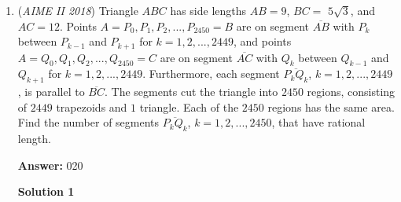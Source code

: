 \begin{enumerate}
 $\dfrac{36}{38} = \dfrac{18}{19}$
$18 + 19 = \boxed{037}$




\textbf{Solution 2}

This solution is essentially the same as solution 1, but it offers a different approach to factoring the polynomial. 

 We want to isolate $a$, so we rewrite $x^4 + 2ax^3 + (2a - 2)x^2 + (-4a + 3)x - 2$ as $x^4-2x^2+3x-2+2ax^3+2ax^2-4ax$.

 We see that $1$ and $-2$ are roots of $x^4-2x^2+3x-2$, so we can factor, yielding $(x-1)(x+2)(x^2-x+1)$.

 We can factor out $2ax$ from the other part of the polynomial, yielding $2ax(x^2+x-2)=2ax(x-1)(x+2)$.

 Thus, 

 \begin{align}x^4 + 2ax^3 + (2a - 2)x^2 + (-4a + 3)x - 2 &= x^4-2x^2+3x-2+2ax^3+2ax^2-4ax \\ &= (x-1)(x+2)(x^2-x+1) + 2ax(x-1)(x+2)\\&= (x-1)(x+2)(x^2+(2a-1)x+1). \\\end{align}

 The rest of the steps are the same as in Solution 1.

 \textbf{See Also:} 


	\item (\textit{AIME II 2018}) Triangle $ABC$ has side lengths $AB = 9$, $BC =$ $5\sqrt{3}$, and $AC = 12$. Points $A = P_{0}, P_{1}, P_{2}, ... , P_{2450} = B$ are on segment $\overline{AB}$ with $P_{k}$ between $P_{k-1}$ and $P_{k+1}$ for $k = 1, 2, ..., 2449$, and points $A = Q_{0}, Q_{1}, Q_{2}, ... , Q_{2450} = C$ are on segment $\overline{AC}$ with $Q_{k}$ between $Q_{k-1}$ and $Q_{k+1}$ for $k = 1, 2, ..., 2449$. Furthermore, each segment $\overline{P_{k}Q_{k}}$, $k = 1, 2, ..., 2449$, is parallel to $\overline{BC}$. The segments cut the triangle into $2450$ regions, consisting of $2449$ trapezoids and $1$ triangle. Each of the $2450$ regions has the same area. Find the number of segments $\overline{P_{k}Q_{k}}$, $k = 1, 2, ..., 2450$, that have rational length.


 
 \textbf{Answer: }020



\textbf{Solution 1}


\end{enumerate}
